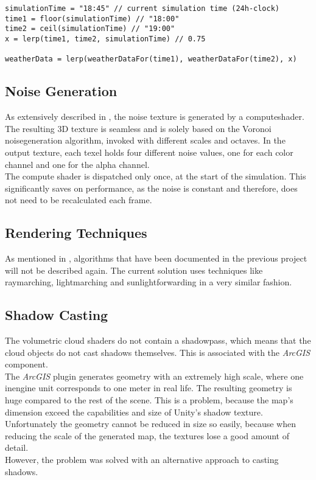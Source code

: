 \begin{lstlisting}[language=HLSL, caption=Pseudo-code for linear interpolation of weather data., label=lst:psuedo:weather:lerp]
simulationTime = "18:45" // current simulation time (24h-clock)
time1 = floor(simulationTime) // "18:00"
time2 = ceil(simulationTime) // "19:00"
x = lerp(time1, time2, simulationTime) // 0.75

weatherData = lerp(weatherDataFor(time1), weatherDataFor(time2), x)
\end{lstlisting}

\clearpage

\subsection{Noise Generation}
\label{section:techimpl:noise}
As extensively described in , the \gls{noise} texture is generated by a \gls{computeshader}.
The resulting 3D texture is seamless and is solely based on the Voronoi \gls{noisegeneration} algorithm, invoked with different scales and octaves.
In the output texture, each \gls{texel} holds four different \gls{noise} values, one for each color channel and one for the alpha channel.
\\
The compute shader is dispatched only once, at the start of the simulation.
This significantly saves on performance, as the \gls{noise} is constant and therefore, does not need to be recalculated each frame.

\subsection{Rendering Techniques}
As mentioned in , algorithms that have been documented in the previous project will not be described again.
The current solution uses techniques like \gls{raymarching}, \gls{lightmarching} and \gls{sunlightforwarding} in a very similar fashion.

\subsection{Shadow Casting}
\label{section:techimpl:shadow}
The \gls{volumetric} cloud \gls{shader}s do not contain a \gls{shadowpass}, which means that the cloud objects do not cast shadows themselves.
This is associated with the \emph{ArcGIS}  component.
\\
The \emph{ArcGIS} plugin generates geometry with an extremely high scale, where one \gls{inengine} unit corresponds to one meter in real life.
The resulting geometry is huge compared to the rest of the scene. This is a problem, because the map's dimension exceed the capabilities and size of Unity's shadow texture.
Unfortunately the geometry cannot be reduced in size so easily, because when reducing the scale of the generated map, the textures lose a good amount of detail.
\\
However, the problem was solved with an alternative approach to casting shadows.

